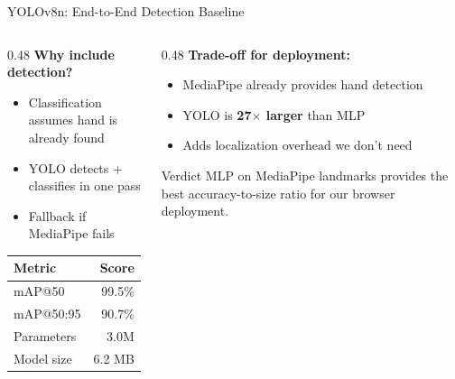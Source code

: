 \documentclass[aspectratio=169]{beamer}
\begin{document}
\begin{frame}{YOLOv8n: End-to-End Detection Baseline}
\begin{columns}[T]
\begin{column}{0.48\textwidth}
    \vspace{0.5em}
    \textbf{Why include detection?}
    \begin{itemize}
        \item Classification assumes hand is already found
        \item YOLO detects + classifies in one pass
        \item Fallback if MediaPipe fails
    \end{itemize}

    \vspace{0.8em}
    \begin{tabular}{lr}
    \toprule
    \textbf{Metric} & \textbf{Score} \\
    \midrule
    mAP@50 & 99.5\% \\
    mAP@50:95 & 90.7\% \\
    Parameters & 3.0M \\
    Model size & 6.2 MB \\
    \bottomrule
    \end{tabular}
\end{column}
\begin{column}{0.48\textwidth}
    \vspace{0.5em}
    \textbf{Trade-off for deployment:}
    \begin{itemize}
        \item MediaPipe already provides hand detection
        \item YOLO is \textbf{27$\times$ larger} than MLP
        \item Adds localization overhead we don't need
    \end{itemize}

    \vspace{0.8em}
    \begin{block}{\small Verdict}
        {\small MLP on MediaPipe landmarks provides the best accuracy-to-size ratio for our browser deployment.}
    \end{block}
\end{column}
\end{columns}
\end{frame}
\end{document}
